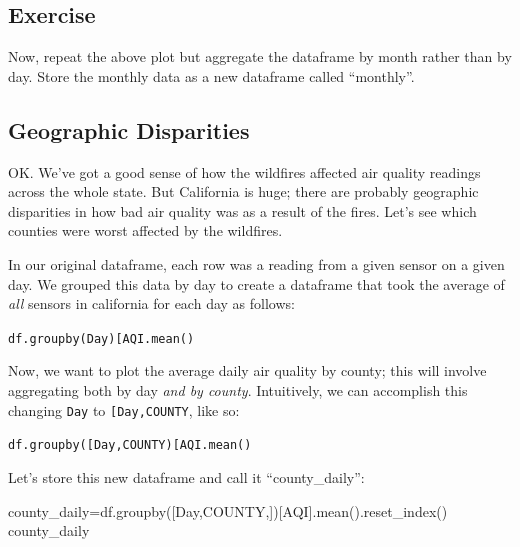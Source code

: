 \documentclass[
  letterpaper,
  DIV=11,
  numbers=noendperiod]{scrreprt}
\newenvironment{Shaded}{\begin{snugshade}}{\end{snugshade}}
\newcommand{\NormalTok}[1]{\textcolor[rgb]{0.00,0.23,0.31}{#1}}
\newcommand{\OperatorTok}[1]{\textcolor[rgb]{0.37,0.37,0.37}{#1}}
\newcommand{\StringTok}[1]{\textcolor[rgb]{0.13,0.47,0.30}{#1}}
\begin{document}
\hypertarget{exercise-4}{%
\subsection{Exercise}\label{exercise-4}}

Now, repeat the above plot but aggregate the dataframe by month rather
than by day. Store the monthly data as a new dataframe called
``monthly''.

\hypertarget{geographic-disparities}{%
\subsection{Geographic Disparities}\label{geographic-disparities}}

OK. We've got a good sense of how the wildfires affected air quality
readings across the whole state. But California is huge; there are
probably geographic disparities in how bad air quality was as a result
of the fires. Let's see which counties were worst affected by the
wildfires.

In our original dataframe, each row was a reading from a given sensor on
a given day. We grouped this data by day to create a dataframe that took
the average of \emph{all} sensors in california for each day as follows:

\texttt{df.groupby(\textquotesingle{}Day\textquotesingle{}){[}\textquotesingle{}AQI\textquotesingle{}{]}.mean()}

Now, we want to plot the average daily air quality by county; this will
involve aggregating both by day \emph{and by county}. Intuitively, we
can accomplish this changing
\texttt{\textquotesingle{}Day\textquotesingle{}} to
\texttt{{[}\textquotesingle{}Day\textquotesingle{},\textquotesingle{}COUNTY\textquotesingle{}{]}},
like so:

\texttt{df.groupby({[}\textquotesingle{}Day\textquotesingle{},\textquotesingle{}COUNTY\textquotesingle{}{]}){[}\textquotesingle{}AQI\textquotesingle{}{]}.mean()}

Let's store this new dataframe and call it ``county\_daily'':

\begin{Shaded}
\begin{Highlighting}[]
\NormalTok{county\_daily}\OperatorTok{=}\NormalTok{df.groupby([}\StringTok{\textquotesingle{}Day\textquotesingle{}}\NormalTok{,}\StringTok{\textquotesingle{}COUNTY\textquotesingle{}}\NormalTok{,])[}\StringTok{\textquotesingle{}AQI\textquotesingle{}}\NormalTok{].mean().reset\_index()}
\NormalTok{county\_daily}
\end{Highlighting}
\end{Shaded}
\end{document}
